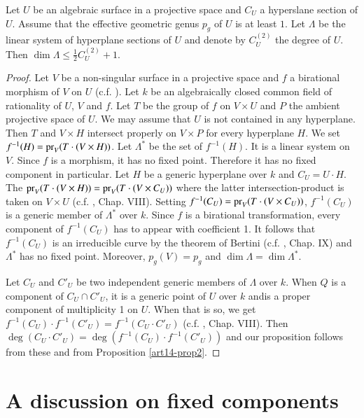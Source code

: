 \begin{proposition}\label{art14-prop3}
Let $U$ be an algebraic surface in a projective space and $C_{U}$ a hyperslane section of $U$. Assume that the effective geometric genus $p_{g}$ of $U$ is at least $1$. Let $\Lambda$ be the linear system of hyperplane sections of $U$ and denote by $C^{(2)}_{U}$ the degree of $U$. Then $\dim \Lambda \leq \frac{1}{2}C^{(2)}_{U}+1$.
\end{proposition}

\begin{proof}
Let $V$ be a non-singular surface in a projective space and $f$ a birational morphism of $V$ on $U$ (c.f. \cite{art14-key}). Let $k$ be an algebraically closed common field of rationality of $U$, $V$ and $f$. Let $T$ be the group of $f$ on $V\times U$ and $P$ the ambient projective space of $U$. We may assume that $U$ is not contained in any hyperplane. Then $T$ and $V\times H$ intersect properly on $V\times P$ for every hyperplane $H$. We set $f^{-1}(H)=\operatorname{\mathrm{pr}}_{V}(T\cdot (V\times H))$. Let $\Lambda^{*}$ be the set of $f^{-1}(H)$. It is a linear system on $V$. Since $f$ is a morphism, it has no fixed point. Therefore it has no fixed component in particular. Let $H$ be a generic hyperplane over $k$ and $C_{U}=U\cdot H$. The $\operatorname{\mathrm{pr}}_{V}(T\cdot (V\times H))=\operatorname{\mathrm{pr}}_{V}(T\cdot (V\times C_{U}))$ where the latter intersection-product is taken on $V\times U$ (c.f. \cite{art14-key25}, Chap. VIII). Setting $f^{-1}(C_{U})=\operatorname{\mathrm{pr}}_{V}(T\cdot (V\times C_{U}))$, $f^{-1}(C_{U})$ is a generic member of $\Lambda^{*}$ over $k$. Since $f$ is a birational transformation, every component of $f^{-1}(C_{U})$ has to appear with coefficient 1. It follows that $f^{-1}(C_{U})$ is an irreducible curve by the theorem of Bertini (c.f. \cite{art14-key25}, Chap. IX) and $\Lambda^{*}$ has no fixed point. Moreover, $p_{g}(V)=p_{g}$ and $\dim \Lambda = \dim \Lambda^{*}$.

Let $C_{U}$ and $C'_{U}$ be two independent generic members of $\Lambda$ over $k$. When $Q$ is a component of $C_{U}\cap C'_{U}$, it is a generic point of $U$ over $k$ and\pageoriginale is a proper component of multiplicity 1 on $U$. When that is so, we get $f^{-1}(C_{U})\cdot f^{-1}(C'_{U})=f^{-1}(C_{U}\cdot C'_{U})$ (c.f. \cite{art14-key25}, Chap. VIII). Then $\deg (C_{U}\cdot C'_{U})=\deg (f^{-1}(C_{U})\cdot f^{-1}(C'_{U}))$ and our proposition follows from these and from Proposition \ref{art14-prop2}.
\end{proof}

\section{A discussion on fixed components}\label{art14-sec3}

